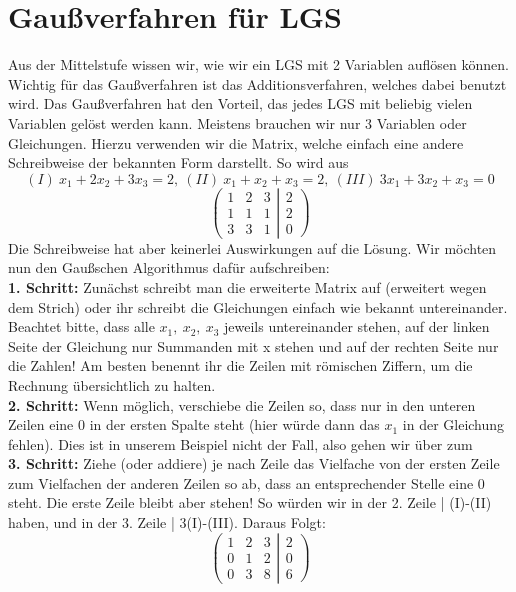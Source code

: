 \section{Gaußverfahren für LGS}
Aus der Mittelstufe wissen wir, wie wir ein LGS mit 2 Variablen auflösen können. Wichtig für das Gaußverfahren ist das Additionsverfahren, welches dabei benutzt wird. Das Gaußverfahren hat den Vorteil, das jedes LGS mit beliebig vielen Variablen gelöst werden kann. Meistens brauchen wir nur 3 Variablen oder Gleichungen. Hierzu verwenden wir die Matrix, welche einfach eine andere Schreibweise der bekannten Form darstellt. So wird aus
\[(I)\ x_1+2x_2+3x_3=2,\ (II)\ x_1+x_2+x_3=2,\ (III)\ 3x_1+3x_2+x_3=0\]
\[
\left(
 \begin{matrix}
  1 & 2 & 3\\
  1 & 1 & 1\\
  3 & 3 & 1
 \end{matrix}
 \left|
  \begin{matrix}
   2\\
   2\\
   0
  \end{matrix}
 \right)
\right.
\]
Die Schreibweise hat aber keinerlei Auswirkungen auf die Lösung. Wir möchten nun den Gaußschen Algorithmus dafür aufschreiben:\\
\textbf{1. Schritt:} Zunächst schreibt man die erweiterte Matrix auf (erweitert wegen dem
Strich) oder ihr schreibt die Gleichungen einfach wie bekannt untereinander. Beachtet bitte, dass alle \(x_1,\ x_2,\ x_3\) jeweils untereinander stehen, auf der linken Seite der Gleichung nur Summanden mit x stehen und auf der rechten Seite nur die Zahlen! Am besten benennt ihr die Zeilen mit römischen Ziffern, um die Rechnung übersichtlich zu halten.\\
\textbf{2. Schritt:} Wenn möglich, verschiebe die Zeilen so, dass nur in den unteren Zeilen eine 0 in der ersten Spalte steht (hier würde dann das \(x_1\) in der Gleichung fehlen). Dies ist in unserem Beispiel nicht der Fall, also gehen wir über zum\\
\textbf{3. Schritt:} Ziehe (oder addiere) je nach Zeile das Vielfache von der ersten Zeile zum Vielfachen der anderen Zeilen so ab, dass an entsprechender Stelle eine 0 steht. Die erste Zeile bleibt aber stehen! So würden wir in der 2. Zeile
| (I)-(II) haben, und in der 3. Zeile | 3(I)-(III). Daraus Folgt:
\[
\left(
 \begin{matrix}
  1 & 2 & 3\\
  0 & 1 & 2\\
  0 & 3 & 8
 \end{matrix}
 \left|
  \begin{matrix}
   2\\
   0\\
   6
  \end{matrix}
 \right)
\right.
\]
